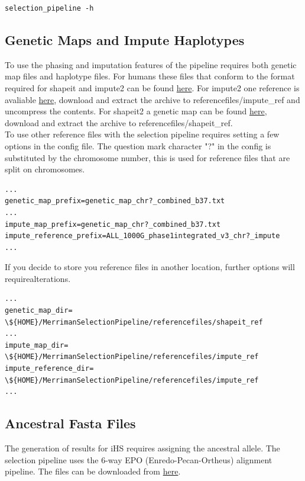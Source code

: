 \documentclass[a4paper,10pt]{article}
\begin{document}
\begin{verbatim}
selection_pipeline -h
\end{verbatim}

\subsection{Genetic Maps and Impute Haplotypes}
To use the phasing and imputation features of the pipeline requires both genetic map files and haplotype files. For humans these files that conform to the format required for shapeit and impute2 can be found \href{http://mathgen.stats.ox.ac.uk/impute/impute_v2.html#reference}{here}. For impute2 one reference is avaliable \href{http://mathgen.stats.ox.ac.uk/impute/ALL_1000G_phase1integrated_v3_impute_macGT1.tgz}{here}, download and extract the archive to referencefiles/impute\_ref and uncompress the contents. For shapeit2 a genetic map can be found \href{http://www.shapeit.fr/files/genetic_map_b37.tar.gz}{here}, download and extract the archive to referencefiles/shapeit\_ref.\\

To use other reference files with the selection pipeline requires setting a few options in the config file. The question mark character "?" in the config is substituted by the chromosome number, this is used for reference files that are split on chromosomes.\\
\begin{verbatim}
...
genetic_map_prefix=genetic_map_chr?_combined_b37.txt
...
impute_map_prefix=genetic_map_chr?_combined_b37.txt
impute_reference_prefix=ALL_1000G_phase1integrated_v3_chr?_impute
...
\end{verbatim}

If you decide to store you reference files in another location, further options will requirealterations.\\ 
\begin{verbatim}
...
genetic_map_dir= \${HOME}/MerrimanSelectionPipeline/referencefiles/shapeit_ref
...
impute_map_dir= \${HOME}/MerrimanSelectionPipeline/referencefiles/impute_ref
impute_reference_dir= \${HOME}/MerrimanSelectionPipeline/referencefiles/impute_ref
...
\end{verbatim}

\subsection{Ancestral Fasta Files}
The generation of results for iHS requires assigning the ancestral allele. The selection pipeline uses the 6-way EPO (Enredo-Pecan-Ortheus) alignment pipeline. The files can be downloaded from \href{ftp://ftp.1000genomes.ebi.ac.uk/vol1/ftp/phase1/analysis_results/supporting/ancestral_alignments/human_ancestor_GRCh37_e59.tar.bz2}{here}.
\end{document}
